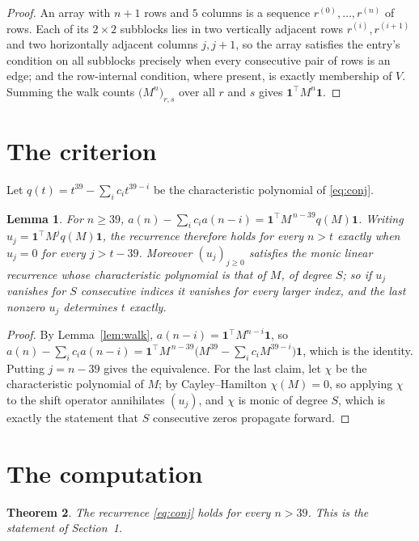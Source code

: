 \documentclass[11pt,a4paper]{article}
\theoremstyle{plain}
\newtheorem{theorem}{Theorem}
\newtheorem{lemma}[theorem]{Lemma}
\theoremstyle{definition}
\begin{document}
\begin{proof}
An array with $n+1$ rows and $5$ columns is a sequence $r^{(0)},\dots,r^{(n)}$ of
rows. Each of its $2\times2$ subblocks lies in two vertically adjacent rows
$r^{(i)},r^{(i+1)}$ and two horizontally adjacent columns $j,j+1$, so the array satisfies
the entry's condition on all subblocks precisely when every consecutive pair of rows is an
edge; and the row-internal condition, where present, is exactly membership of $V$. Summing
the walk counts $\bigl(M^{n}\bigr)_{r,s}$ over all $r$ and $s$ gives
$\mathbf{1}^{\!\top}M^{n}\mathbf{1}$.
\end{proof}

\section{The criterion}

Let $q(t)=t^{39}-\sum_i c_i t^{39-i}$ be the characteristic polynomial of
\eqref{eq:conj}.

\begin{lemma}\label{lem:crit}
For $n\ge39$,
$a(n)-\sum_i c_i a(n-i)=\mathbf{1}^{\!\top}M^{\,n-39}q(M)\mathbf{1}$. Writing
$u_j=\mathbf{1}^{\!\top}M^{j}q(M)\mathbf{1}$, the recurrence therefore holds for every
$n>t$ exactly when $u_j=0$ for every $j>t-39$. Moreover $(u_j)_{j\ge0}$ satisfies the
monic linear recurrence whose characteristic polynomial is that of $M$, of degree $S$; so
if $u_j$ vanishes for $S$ consecutive indices it vanishes for every larger index, and the
last nonzero $u_j$ determines $t$ exactly.
\end{lemma}

\begin{proof}
By Lemma~\ref{lem:walk}, $a(n-i)=\mathbf{1}^{\!\top}M^{n-i}\mathbf{1}$, so
$a(n)-\sum_i c_i a(n-i)
=\mathbf{1}^{\!\top}M^{\,n-39}\bigl(M^{39}-\sum_i c_i M^{39-i}\bigr)
\mathbf{1}$, which is the identity. Putting $j=n-39$ gives the equivalence. For the
last claim, let $\chi$ be the characteristic polynomial of $M$; by Cayley--Hamilton
$\chi(M)=0$, so applying $\chi$ to the shift operator annihilates $(u_j)$, and $\chi$ is
monic of degree $S$, which is exactly the statement that $S$ consecutive zeros propagate
forward.
\end{proof}

\section{The computation}

\begin{theorem}
The recurrence \eqref{eq:conj} holds for every $n>39$. This is the statement of
Section~1.
\end{theorem}
\end{document}
